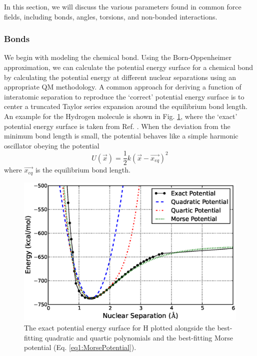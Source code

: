 In this section, we will discuss the various parameters found in common force
fields, including bonds, angles, torsions, and non-bonded interactions.

\subsubsection{Bonds}
\label{sec1:Bond}

We begin with modeling the chemical bond. Using the Born-Oppenheimer
approximation, we can calculate the potential energy surface for a chemical bond
by calculating the potential energy at different nuclear separations using an
appropriate QM methodology. A common approach for deriving a function of
interatomic separation to reproduce the `correct' potential energy surface is to
center a truncated Taylor series expansion around the equilibrium bond length.
An example for the Hydrogen molecule is shown in Fig.
\ref{fig1:HydrogenMoleculeBond}, where the `exact' potential energy surface is
taken from Ref. . When the deviation from the minimum bond
length is small, the potential behaves like a simple harmonic oscillator obeying
the potential 
\begin{equation}
   U(\vec{x}) = \frac 1 2 k (\vec{x} - \vec{x_{eq}}) ^ 2
   \label{eq1:HarmonicOscillator}
\end{equation}
where $\vec{x_{eq}}$ is the equilibrium bond length.

\begin{figure}
   \includegraphics[width=6.5in]{HydrogenMoleculeBond.ps}
   \caption{The exact potential energy surface for H \cite{Kolos1964}
            plotted alongside the best-fitting quadratic and quartic polynomials
            and the best-fitting Morse potential (Eq.
            \ref{eq1:MorsePotential}).}
   \label{fig1:HydrogenMoleculeBond}
\end{figure}

